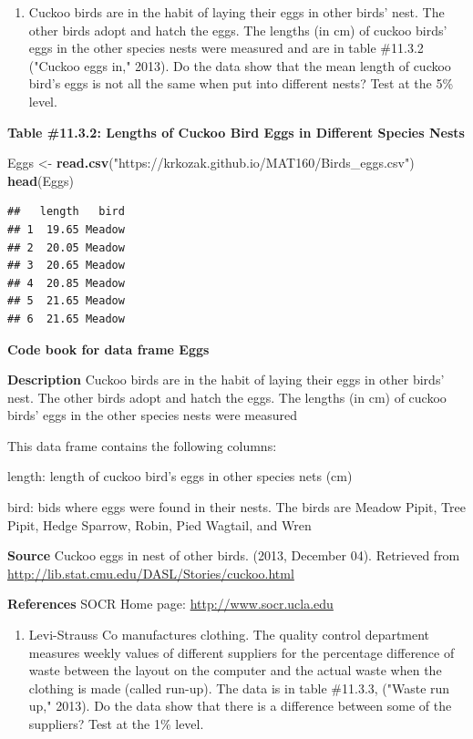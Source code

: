 \documentclass[
]{book}
\newenvironment{Shaded}{\begin{snugshade}}{\end{snugshade}}
\newcommand{\KeywordTok}[1]{\textcolor[rgb]{0.13,0.29,0.53}{\textbf{#1}}}
\newcommand{\NormalTok}[1]{#1}
\newcommand{\StringTok}[1]{\textcolor[rgb]{0.31,0.60,0.02}{#1}}
\providecommand{\tightlist}{%
  \setlength{\itemsep}{0pt}\setlength{\parskip}{0pt}}
\begin{document}
\begin{enumerate}
\def\labelenumi{\arabic{enumi}.}
\tightlist
\item
  Cuckoo birds are in the habit of laying their eggs in other birds' nest. The other birds adopt and hatch the eggs. The lengths (in cm) of cuckoo birds' eggs in the other species nests were measured and are in table \#11.3.2 ("Cuckoo eggs in," 2013). Do the data show that the mean length of cuckoo bird's eggs is not all the same when put into different nests? Test at the 5\% level.
\end{enumerate}

\textbf{Table \#11.3.2: Lengths of Cuckoo Bird Eggs in Different Species Nests}

\begin{Shaded}
\begin{Highlighting}[]
\NormalTok{Eggs <-}\StringTok{ }\KeywordTok{read.csv}\NormalTok{(}\StringTok{"https://krkozak.github.io/MAT160/Birds_eggs.csv"}\NormalTok{)}
\KeywordTok{head}\NormalTok{(Eggs)}
\end{Highlighting}
\end{Shaded}

\begin{verbatim}
##   length   bird
## 1  19.65 Meadow
## 2  20.05 Meadow
## 3  20.65 Meadow
## 4  20.85 Meadow
## 5  21.65 Meadow
## 6  21.65 Meadow
\end{verbatim}

\textbf{Code book for data frame Eggs}

\textbf{Description}
Cuckoo birds are in the habit of laying their eggs in other birds' nest. The other birds adopt and hatch the eggs. The lengths (in cm) of cuckoo birds' eggs in the other species nests were measured

This data frame contains the following columns:

length: length of cuckoo bird's eggs in other species nets (cm)

bird: bids where eggs were found in their nests. The birds are Meadow Pipit, Tree Pipit, Hedge Sparrow, Robin, Pied Wagtail, and Wren

\textbf{Source}
Cuckoo eggs in nest of other birds. (2013, December 04). Retrieved from
\url{http://lib.stat.cmu.edu/DASL/Stories/cuckoo.html}

\textbf{References}
SOCR Home page: \url{http://www.socr.ucla.edu}

\begin{enumerate}
\def\labelenumi{\arabic{enumi}.}
\setcounter{enumi}{1}
\tightlist
\item
  Levi-Strauss Co manufactures clothing. The quality control department measures weekly values of different suppliers for the percentage difference of waste between the layout on the computer and the actual waste when the clothing is made (called run-up). The data is in table \#11.3.3, ("Waste run up," 2013). Do the data show that there is a difference between some of the suppliers? Test at the 1\% level.
\end{enumerate}
\end{document}
